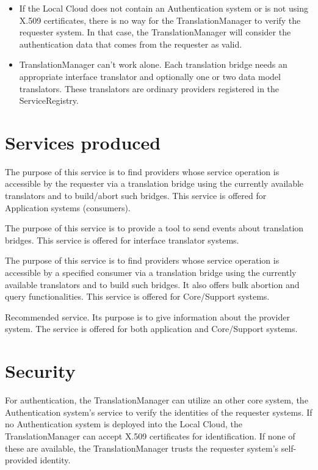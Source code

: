 \documentclass[a4paper]{arrowhead}
\begin{document}
\begin{itemize}
    \item If the Local Cloud does not contain an Authentication system or is not using X.509 certificates, there is no way for the TranslationManager to verify the requester system. In that case, the TranslationManager will consider the authentication data that comes from the requester as valid.
    \item TranslationManager can't work alone. Each translation bridge needs an appropriate 
    interface translator and optionally one or two data model translators. These translators are ordinary providers registered in the ServiceRegistry.
\end{itemize}

\newpage

\section{Services produced}
\label{sec:services}

{}
The purpose of this service is to find providers whose service operation is accessible by the requester via a translation bridge using the currently available translators and to build/abort such bridges. This service is offered for Application systems (consumers). 

The purpose of this service is to provide a tool to send events about translation bridges. This service is offered for interface translator systems.

The purpose of this service is to find providers whose service operation is accessible by a specified consumer via a translation bridge using the currently available translators and to build such bridges. It also offers bulk abortion and query functionalities. This service is offered for Core/Support systems.

Recommended service. Its purpose is to give information about the provider system. The service is offered for both application and Core/Support systems.

\newpage

\section{Security}
\label{sec:security}

For authentication, the TranslationManager can utilize an other core system, the Authentication system's service to verify the identities of the requester systems. If no Authentication system is deployed into the Local Cloud, the TranslationManager can accept X.509 certificates for identification. If none of these are available, the TranslationManager trusts the requester system's self-provided identity.
\end{document}
